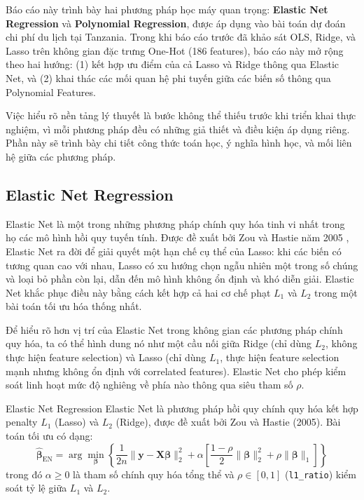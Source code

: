 \documentclass[12pt,a4paper]{article}
\begin{document}
Báo cáo này trình bày hai phương pháp học máy quan trọng: \textbf{Elastic Net Regression} và \textbf{Polynomial Regression}, được áp dụng vào bài toán dự đoán chi phí du lịch tại Tanzania. Trong khi báo cáo trước đã khảo sát OLS, Ridge, và Lasso trên không gian đặc trưng One-Hot (186 features), báo cáo này mở rộng theo hai hướng: (1) kết hợp ưu điểm của cả Lasso và Ridge thông qua Elastic Net, và (2) khai thác các mối quan hệ phi tuyến giữa các biến số thông qua Polynomial Features.

Việc hiểu rõ nền tảng lý thuyết là bước không thể thiếu trước khi triển khai thực nghiệm, vì mỗi phương pháp đều có những giả thiết và điều kiện áp dụng riêng. Phần này sẽ trình bày chi tiết công thức toán học, ý nghĩa hình học, và mối liên hệ giữa các phương pháp.

\subsection{Elastic Net Regression}

Elastic Net là một trong những phương pháp chính quy hóa tinh vi nhất trong họ các mô hình hồi quy tuyến tính. Được đề xuất bởi Zou và Hastie năm 2005 \cite{zou2005}, Elastic Net ra đời để giải quyết một hạn chế cụ thể của Lasso: khi các biến có tương quan cao với nhau, Lasso có xu hướng chọn ngẫu nhiên một trong số chúng và loại bỏ phần còn lại, dẫn đến mô hình không ổn định và khó diễn giải. Elastic Net khắc phục điều này bằng cách kết hợp cả hai cơ chế phạt $L_1$ và $L_2$ trong một bài toán tối ưu hóa thống nhất.

Để hiểu rõ hơn vị trí của Elastic Net trong không gian các phương pháp chính quy hóa, ta có thể hình dung nó như một cầu nối giữa Ridge (chỉ dùng $L_2$, không thực hiện feature selection) và Lasso (chỉ dùng $L_1$, thực hiện feature selection mạnh nhưng không ổn định với correlated features). Elastic Net cho phép kiểm soát linh hoạt mức độ nghiêng về phía nào thông qua siêu tham số $\rho$.

\begin{definitionbox}{Elastic Net Regression}
Elastic Net là phương pháp hồi quy chính quy hóa kết hợp penalty $L_1$ (Lasso) và $L_2$ (Ridge), được đề xuất bởi Zou và Hastie (2005). Bài toán tối ưu có dạng:
\begin{equation}
\hat{\boldsymbol{\beta}}_{\text{EN}} = \arg\min_{\boldsymbol{\beta}} \left\{ \frac{1}{2n} \|\mathbf{y} - \mathbf{X}\boldsymbol{\beta}\|_2^2 + \alpha \left[ \frac{1-\rho}{2}\|\boldsymbol{\beta}\|_2^2 + \rho\|\boldsymbol{\beta}\|_1 \right] \right\}
\end{equation}
trong đó $\alpha \geq 0$ là tham số chính quy hóa tổng thể và $\rho \in [0,1]$ (\texttt{l1\_ratio}) kiểm soát tỷ lệ giữa $L_1$ và $L_2$.
\end{definitionbox}
\end{document}
